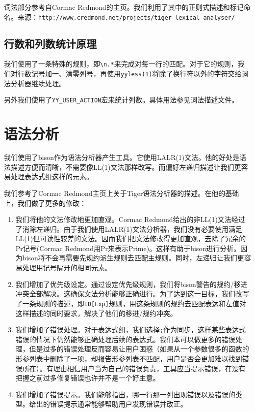 词法部分参考自Cormac Redmond的主页。我们利用了其中的正则式描述和标记命名。来源：\texttt{http://www.credmond.net/projects/tiger-lexical-analyser/}


\subsection{行数和列数统计原理}

我们使用了一条特殊的规则，即\texttt{\textbackslash n.*}来完成对每一行的匹配。对于它的规则，我们对行数记号加一、清零列号，再使用\texttt{yyless(1)}将除了换行符以外的字符交给词法分析器继续处理。

另外我们使用了\texttt{YY\_USER\_ACTION}宏来统计列数。具体用法参见词法描述文件。

\section{语法分析}

我们使用了bison作为语法分析器产生工具。它使用LALR(1)文法。他的好处是语法描述方便而清晰，不需要像LL(1)文法那样改写。而偏好左递归描述让我们更容易处理表达式组这样的元素。

我们参考了Cormac Redmond主页上关于Tiger语法分析器的描述。在他的基础上，我们做了更多的修改：

\begin{enumerate}
\item 我们将他的文法修改地更加直观。Cormac Redmond给出的非LL(1)文法经过了消除左递归。由于我们使用LALR(1)文法分析器，我们没有必要使用满足LL(1)但可读性较差的文法。因而我们把文法修改得更加直观，去除了冗余的Pr记号(Cormac Redmond用Pr来表示Prime)。这样有助于bison进行分析。因为bison将不会再需要先规约派生规则去匹配主规则。同时，左递归让我们更容易处理用记号隔开的相同元素。
\item 我们增加了优先级设定。通过设定优先级规则，我们将bison警告的规约/移进冲突全部解决。这确保文法分析能够正确进行。为了达到这一目标，我们改写了一条规则的描述，即\texttt{ID[Exp]}规则，用这条规则的规约去匹配表达和左值对这样描述的同时要求，解决了他们的移进/规约冲突。
\item 我们增加了错误处理。对于表达式组，我们选择\texttt{;}作为同步，这样某些表达式错误的情况下仍然能够正确处理后续的表达式。我们本可以做更多的错误处理，但是过多的错误处理反而容易让用户困惑（如果从一个参数很多的函数的形参列表中删除了一项，却报告形参列表不匹配，用户是否会更加难以找到错误所在）。有理由相信用户当为自己的错误负责，工具应当提示错误，在没有把握之前过多修复错误也许并不是一个好主意。
\item 我们增加了错误提示。我们能够指出，哪一行那一列出现错误以及错误的类型。给出的错误提示通常能够帮助用户发现错误并改正。
\end{enumerate}

